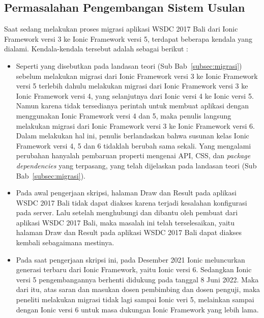 \subsection{Permasalahan Pengembangan Sistem Usulan}
\label{sec:analisisPermasalahanSistemKini}
Saat sedang melakukan proses migrasi aplikasi WSDC 2017 Bali dari Ionic Framework versi 3 ke Ionic Framework versi 5, terdapat beberapa kendala yang dialami. Kendala-kendala tersebut adalah sebagai berikut : 

\begin{itemize}
	\item Seperti yang disebutkan pada landasan teori (Sub Bab~\ref{subsec:migrasi}) sebelum melakukan migrasi dari Ionic Framework versi 3 ke Ionic Framework versi 5 terlebih dahulu melakukan migrasi dari Ionic Framework versi 3 ke Ionic Framework versi 4, yang selanjutnya dari Ionic versi 4 ke Ionic versi 5. Namun karena tidak tersedianya perintah untuk membuat aplikasi dengan menggunakan Ionic Framework versi 4 dan 5, maka penulis langsung melakukan migrasi dari Ionic Framework versi 3 ke Ionic Framework versi 6. Dalam melakukan hal ini, penulis berlandaskan bahwa susunan kelas Ionic Framework versi 4, 5 dan 6 tidaklah berubah sama sekali. Yang mengalami perubahan hanyalah pembaruan properti mengenai API, CSS, dan {\it package dependencies} yang terpasang, yang telah dijelaskan pada landasan teori (Sub Bab~\ref{subsec:migrasi}).
	
	\item Pada awal pengerjaan skripsi, halaman Draw dan Result pada aplikasi WSDC 2017 Bali tidak dapat diakses karena terjadi kesalahan konfigurasi pada server. Lalu setelah menghubungi dan dibantu oleh pembuat dari aplikasi WSDC 2017 Bali, maka masalah ini telah terselesaikan, yaitu halaman Draw dan Result pada aplikasi WSDC 2017 Bali dapat diakses kembali sebagaimana mestinya.
	
	\item Pada saat pengerjaan skripsi ini, pada Desember 2021 Ionic meluncurkan generasi terbaru dari Ionic Framework, yaitu Ionic versi 6. Sedangkan Ionic versi 5 pengembangannya berhenti didukung pada tanggal 8 Juni 2022. Maka dari itu, atas saran dan masukan dosen pembimbing dan dosen penguji, maka peneliti melakukan migrasi tidak lagi sampai Ionic veri 5, melainkan sampai dengan Ionic versi 6 untuk masa dukungan Ionic Framework yang lebih lama.
	
\end{itemize}
